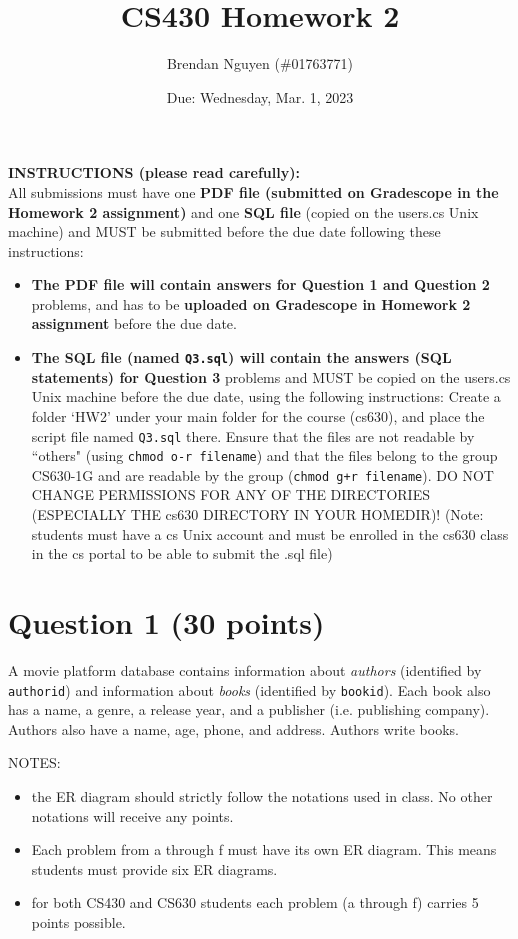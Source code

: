 \documentclass[letterpaper, 11pt]{article}
\title{CS430 Homework 2}
\author{Brendan Nguyen (\#01763771)}
\date{Due: Wednesday, Mar. 1, 2023}
\begin{document}
\maketitle

\textbf{INSTRUCTIONS (please read carefully):}\\
All submissions must have one \textbf{PDF file (submitted on Gradescope in the Homework 2 assignment)} and one \textbf{SQL file} (copied on the users.cs Unix machine) and MUST be submitted before the due date following these instructions:
\begin{itemize}
    \item \textbf{The PDF file will contain answers for Question 1 and Question 2} problems, and has to be \textbf{uploaded on Gradescope in Homework 2 assignment} before the due date.
    \item \textbf{The SQL file (named \texttt{Q3.sql}) will contain the answers (SQL statements) for Question 3} problems and MUST be copied on the users.cs Unix machine before the due date, using the following instructions: Create a folder `HW2' under your main folder for the course (cs630), and place the script file named \texttt{Q3.sql} there. Ensure that the files are not readable by ``others" (using \texttt{chmod o-r filename}) and that the files belong to the group CS630-1G and are readable by the group (\texttt{chmod g+r filename}). DO NOT CHANGE PERMISSIONS FOR ANY OF THE DIRECTORIES (ESPECIALLY THE cs630 DIRECTORY IN YOUR HOMEDIR)!  (Note: students must have a cs Unix account and must be enrolled in the cs630 class in the cs portal to be able to submit the .sql file)
\end{itemize}

\section*{Question 1 (30 points)}

A movie platform database contains information about \textit{authors} (identified by \texttt{authorid}) and information about \textit{books} (identified by \texttt{bookid}). Each book also has a name, a genre, a release year, and a publisher (i.e. publishing company). Authors also have a name, age, phone, and address. Authors write books.

NOTES:
\begin{itemize}
    \item the ER diagram should strictly follow the notations used in class. No other notations will receive any points.
    \item Each problem from a through f must have its own ER diagram. This means students must provide six ER diagrams.
    \item for both CS430 and CS630 students each problem (a through f) carries 5 points possible.
\end{itemize}
\end{document}

